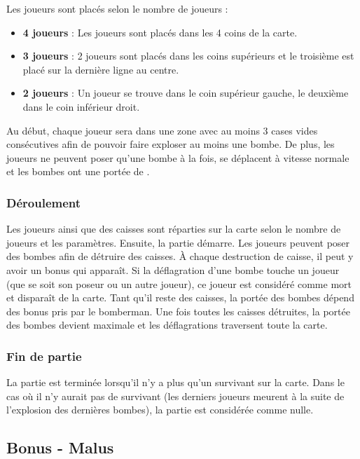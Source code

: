 Les joueurs sont placés selon le nombre de joueurs : 
\begin{itemize}
\item \textbf{4 joueurs} : Les joueurs sont placés dans les 4 coins de la carte.
\item \textbf{3 joueurs} : 2 joueurs sont placés dans les coins supérieurs et le troisième est placé sur la dernière ligne au centre.
\item \textbf{2 joueurs} : Un joueur se trouve dans le coin supérieur gauche, le deuxième dans le coin inférieur droit.
\end{itemize}

Au début, chaque joueur sera dans une zone avec au moins 3 cases vides consécutives afin de pouvoir faire exploser au moins une bombe. De plus, les joueurs ne peuvent poser qu'une bombe à la fois, se déplacent à vitesse normale et les bombes ont une portée de \porteeParDefaut .

\subsubsection{Déroulement}

Les joueurs ainsi que des caisses sont réparties sur la carte selon le nombre de joueurs et les paramètres. Ensuite, la partie démarre. Les joueurs peuvent poser des bombes afin de détruire des caisses. À chaque destruction de caisse, il peut y avoir un bonus qui apparaît. Si la déflagration d'une bombe touche un joueur (que se soit son poseur ou un autre joueur), ce joueur est considéré comme mort et disparaît de la carte. Tant qu'il reste des caisses, la portée des bombes dépend des bonus pris par le bomberman. Une fois toutes les caisses détruites, la portée des bombes devient maximale et les déflagrations traversent toute la carte.

\subsubsection{Fin de partie}

La partie est terminée lorsqu'il n'y a plus qu'un survivant sur la carte. Dans le cas où il n'y aurait pas de survivant (les derniers joueurs meurent à la suite de l'explosion des dernières bombes), la partie est considérée comme nulle.

\subsection{Bonus - Malus}

